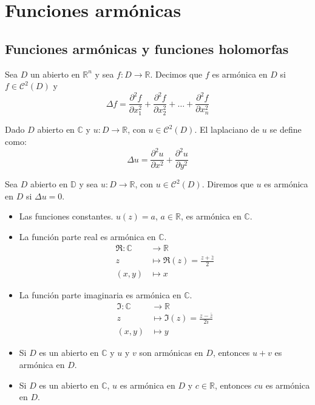 \chapter{Funciones armónicas}

\section{Funciones armónicas y funciones holomorfas}
\begin{definition}
    Sea $D$ un abierto en $\mathbb{R}^n$ y sea $f: D \to \mathbb{R}$.
    Decimos que $f$ es armónica en $D$ si $f \in \mathcal{C}^2(D)$ y
    $$\Delta f = \frac{\partial^2f}{\partial x_1^2} + \frac{\partial^2f}{\partial x_2^2} + \dots + \frac{\partial^2f}{\partial x_n^2}$$
\end{definition}

\begin{definition}
    Dado $D$ abierto en $\mathbb{C}$ y $u: D \to \mathbb{R}$, con $u \in \mathcal{C}^2(D)$.
    El laplaciano de $u$ se define como:
    $$\Delta u = \frac{\partial^2u}{\partial x^2} + \frac{\partial^2u}{\partial y^2}$$
\end{definition}

\begin{definition}
    Sea $D$ abierto en $\mathbb{D}$ y sea $u: D \to \mathbb{R}$, con $u \in \mathcal{C}^2(D)$.
    Diremos que $u$ es armónica en $D$ si $\Delta u = 0$.
\end{definition}

\begin{example}
    \hfill
    \begin{itemize}
        \item Las funciones constantes.
              $u(z) = a$, $a \in \mathbb{R}$, es armónica en $\mathbb{C}$.
        \item La función parte real es armónica en $\mathbb{C}$.
              \begin{align*}
                  \Re: \mathbb{C} & \to \mathbb{R}                         \\
                  z               & \mapsto \Re(z) = \frac{z + \bar{z}}{2} \\
                  (x, y)          & \mapsto x
              \end{align*}
        \item La función parte imaginaria es armónica en $\mathbb{C}$.
              \begin{align*}
                  \Im: \mathbb{C} & \to \mathbb{R}                          \\
                  z               & \mapsto \Im(z) = \frac{z - \bar{z}}{2i} \\
                  (x, y)          & \mapsto y
              \end{align*}
        \item Si $D$ es un abierto en $\mathbb{C}$ y $u$ y $v$ son armónicas en $D$, entonces $u+v$ es armónica en $D$.
        \item Si $D$ es un abierto en $\mathbb{C}$, $u$ es armónica en $D$ y $c \in \mathbb{R}$, entonces $cu$ es armónica en $D$.
    \end{itemize}
\end{example}

